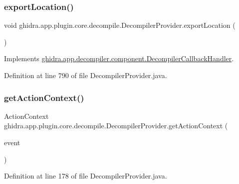 \subsubsection{\texorpdfstring{exportLocation()}{exportLocation()}}
{\footnotesize\ttfamily void ghidra.\+app.\+plugin.\+core.\+decompile.\+Decompiler\+Provider.\+export\+Location (\begin{DoxyParamCaption}{ }\end{DoxyParamCaption})\hspace{0.3cm}{\ttfamily [inline]}}



Implements \mbox{\hyperlink{interfaceghidra_1_1app_1_1decompiler_1_1component_1_1_decompiler_callback_handler_a94124bad6258c05b2de2fd1e9c7069b1}{ghidra.\+app.\+decompiler.\+component.\+Decompiler\+Callback\+Handler}}.



Definition at line 790 of file Decompiler\+Provider.\+java.

\mbox{\label{classghidra_1_1app_1_1plugin_1_1core_1_1decompile_1_1_decompiler_provider_ab571e99016e4543a5b2d4992f524b239}} 
\subsubsection{\texorpdfstring{getActionContext()}{getActionContext()}}
{\footnotesize\ttfamily Action\+Context ghidra.\+app.\+plugin.\+core.\+decompile.\+Decompiler\+Provider.\+get\+Action\+Context (\begin{DoxyParamCaption}\item[{Mouse\+Event}]{event }\end{DoxyParamCaption})\hspace{0.3cm}{\ttfamily [inline]}}



Definition at line 178 of file Decompiler\+Provider.\+java.

